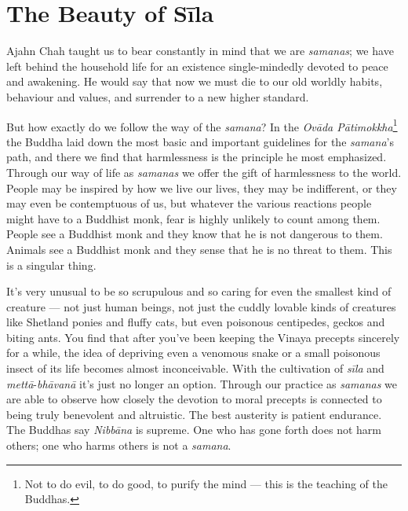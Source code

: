 

\chapter{The Beauty of Sīla}
\markright{\chapterAuthor}

Ajahn Chah taught us to bear constantly in mind that we are
\emph{samanas}; we have left behind the household life for an existence
single-mindedly devoted to peace and awakening. He would say that now we
must die to our old worldly habits, behaviour and values, and surrender
to a new higher standard.

But how exactly do we follow the way of the \emph{samana}? In the
\emph{Ovāda Pātimokkha}\footnote{Not to do evil, to do good, to purify
  the mind --- this is the teaching of the Buddhas.} the Buddha laid
down the most basic and important guidelines for the \emph{samana}'s
path, and there we find that harmlessness is the principle he most
emphasized. Through our way of life as \emph{samanas} we offer the gift
of harmlessness to the world. People may be inspired by how we live our
lives, they may be indifferent, or they may even be contemptuous of us,
but whatever the various reactions people might have to a Buddhist monk,
fear is highly unlikely to count among them. People see a Buddhist monk
and they know that he is not dangerous to them. Animals see a Buddhist
monk and they sense that he is no threat to them. This is a singular
thing.

It's very unusual to be so scrupulous and so caring for even the
smallest kind of creature --- not just human beings, not just the cuddly
lovable kinds of creatures like Shetland ponies and fluffy cats, but
even poisonous centipedes, geckos and biting ants. You find that after
you've been keeping the Vinaya precepts sincerely for a while, the idea
of depriving even a venomous snake or a small poisonous insect of its
life becomes almost inconceivable. With the cultivation of \emph{sīla}
and \emph{mettā}-\emph{bhāvanā} it's just no longer an option. Through
our practice as \emph{samanas} we are able to observe how closely the
devotion to moral precepts is connected to being truly benevolent and
altruistic. The best austerity is patient endurance. The Buddhas say
\emph{Nibbāna} is supreme. One who has gone forth does not harm others;
one who harms others is not a \emph{samana}.

